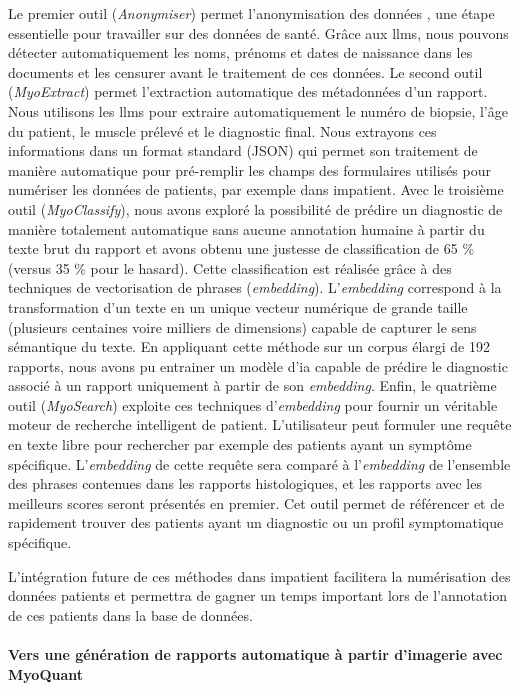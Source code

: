 Le premier outil (\textit{Anonymiser}) permet l’anonymisation des données , une étape essentielle pour travailler sur des données de santé. Grâce aux \gls{llms}, nous pouvons détecter automatiquement les noms, prénoms et dates de naissance dans les documents et les censurer avant le traitement de ces données. Le second outil (\textit{MyoExtract}) permet l’extraction automatique des métadonnées d’un rapport. Nous utilisons les \gls{llms} pour extraire automatiquement le numéro de biopsie, l’âge du patient, le muscle prélevé et le diagnostic final. Nous extrayons ces informations dans un format standard (JSON) qui permet son traitement de manière automatique pour pré-remplir les champs des formulaires utilisés pour numériser les données de patients, par exemple dans \gls{impatient}. Avec le troisième outil (\textit{MyoClassify}), nous avons exploré la possibilité de prédire un diagnostic de manière totalement automatique sans aucune annotation humaine à partir du texte brut du rapport et avons obtenu une justesse de classification de 65 \% (versus 35 \% pour le hasard). Cette classification est réalisée grâce à des techniques de vectorisation de phrases (\textit{embedding}). L’\textit{embedding} correspond à la transformation d’un texte en un unique vecteur numérique de grande taille (plusieurs centaines voire milliers de dimensions) capable de capturer le sens sémantique du texte. En appliquant cette méthode sur un corpus élargi de 192 rapports, nous avons pu entrainer un modèle d’\gls{ia} capable de prédire le diagnostic associé à un rapport uniquement à partir de son \textit{embedding}. Enfin, le quatrième outil (\textit{MyoSearch}) exploite ces techniques d’\textit{embedding} pour fournir un véritable moteur de recherche intelligent de patient. L’utilisateur peut formuler une requête en texte libre pour rechercher par exemple des patients ayant un symptôme spécifique. L’\textit{embedding} de cette requête sera comparé à l’\textit{embedding} de l’ensemble des phrases contenues dans les rapports histologiques, et les rapports avec les meilleurs scores seront présentés en premier. Cet outil permet de référencer et de rapidement trouver des patients ayant un diagnostic ou un profil symptomatique spécifique.

L’intégration future de ces méthodes dans \gls{impatient} facilitera la numérisation des données patients et permettra de gagner un temps important lors de l’annotation de ces patients dans la base de données.

\paragraph{\textbf{Vers une génération de rapports automatique à partir d’imagerie avec MyoQuant}}\mbox{}\\

